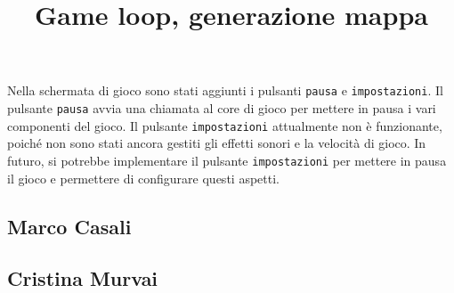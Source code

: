 \documentclass[a4paper,12pt]{report}
\begin{document}
Nella schermata di gioco sono stati aggiunti i pulsanti \texttt{pausa} e \texttt{impostazioni}. Il pulsante \texttt{pausa} avvia una chiamata al core di gioco per mettere in pausa i vari componenti del gioco. Il pulsante \texttt{impostazioni} attualmente non è funzionante, poiché non sono stati ancora gestiti gli effetti sonori e la velocità di gioco. In futuro, si potrebbe implementare il pulsante \texttt{impostazioni} per mettere in pausa il gioco e permettere di configurare questi aspetti.
\newpage
\subsection{Marco Casali}
\title{\textbf{Game loop, generazione mappa}}




\newpage
\subsection{Cristina Murvai}
\end{document}
